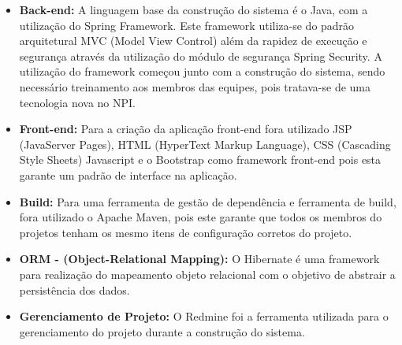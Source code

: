 \begin{itemize}
	\item \textbf{Back-end:} A linguagem base da construção do sistema é o Java, com a utilização do Spring Framework. Este framework utiliza-se do padrão arquitetural MVC (Model View Control) além da rapidez de execução e segurança através da utilização do módulo de segurança Spring Security. A utilização do framework começou junto com a construção do sistema, sendo necessário treinamento aos membros das equipes, pois tratava-se de uma tecnologia nova no NPI.
	
	\item \textbf{Front-end:} Para a criação da aplicação front-end fora utilizado JSP (JavaServer Pages), HTML (HyperText Markup Language), CSS (Cascading Style Sheets) Javascript e o Bootstrap como framework front-end pois esta garante um padrão de interface na aplicação.
	
	\item \textbf{Build:} Para uma ferramenta de gestão de dependência e ferramenta de build, fora utilizado o Apache Maven, pois este garante que todos os membros do projetos tenham os mesmo itens de configuração corretos do projeto.
	
	\item \textbf{ORM - (Object-Relational Mapping):} O Hibernate é uma framework para realização do mapeamento objeto relacional com o objetivo de abstrair a persistência dos dados.
	
	\item \textbf{Gerenciamento de Projeto:} O Redmine foi a ferramenta utilizada para o gerenciamento do projeto durante a construção do sistema.
\end{itemize}

